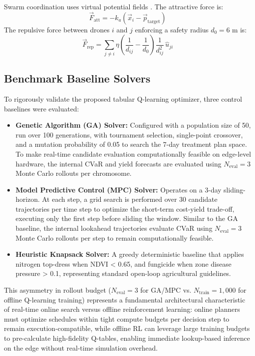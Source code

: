 \documentclass[review,3p,times,authoryear]{elsarticle}
\begin{document}
Swarm coordination uses virtual potential fields \citep{khatib1986}. The attractive force is:
\begin{equation}
\vec{F}_\text{att} = -k_a(\vec{x}_i - \vec{p}_\text{target})
\end{equation}
The repulsive force between drones $i$ and $j$ enforcing a safety radius $d_0 = 6$ m is:
\begin{equation}
\vec{F}_\text{rep} = \sum_{j \neq i} \eta\!\left(\frac{1}{d_{ij}} - \frac{1}{d_0}\right)\frac{1}{d_{ij}^2}\,\hat{u}_{ji}
\end{equation}

\subsection{Benchmark Baseline Solvers}
To rigorously validate the proposed tabular Q-learning optimizer, three control baselines were evaluated:
\begin{itemize}
    \item \textbf{Genetic Algorithm (GA) Solver:} Configured with a population size of 50, run over 100 generations, with tournament selection, single-point crossover, and a mutation probability of 0.05 to search the 7-day treatment plan space. To make real-time candidate evaluation computationally feasible on edge-level hardware, the internal CVaR and yield forecasts are evaluated using $N_{\text{eval}} = 3$ Monte Carlo rollouts per chromosome.
    \item \textbf{Model Predictive Control (MPC) Solver:} Operates on a 3-day sliding-horizon. At each step, a grid search is performed over 30 candidate trajectories per time step to optimize the short-term cost-yield trade-off, executing only the first step before sliding the window. Similar to the GA baseline, the internal lookahead trajectories evaluate CVaR using $N_{\text{eval}} = 3$ Monte Carlo rollouts per step to remain computationally feasible.
    \item \textbf{Heuristic Knapsack Solver:} A greedy deterministic baseline that applies nitrogen top-dress when NDVI < 0.65, and fungicide when zone disease pressure > 0.1, representing standard open-loop agricultural guidelines.
\end{itemize}
This asymmetry in rollout budget ($N_{\text{eval}} = 3$ for GA/MPC vs. $N_{\text{train}} = 1,000$ for offline Q-learning training) represents a fundamental architectural characteristic of real-time online search versus offline reinforcement learning: online planners must optimize schedules within tight compute budgets per decision step to remain execution-compatible, while offline RL can leverage large training budgets to pre-calculate high-fidelity Q-tables, enabling immediate lookup-based inference on the edge without real-time simulation overhead.
\end{document}
